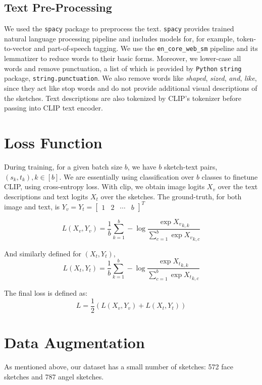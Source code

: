 \subsection{Text Pre-Processing}
We used the \texttt{spacy} package to preprocess the text. \texttt{spacy} provides trained natural language processing pipeline and includes models for, for example, token-to-vector and part-of-speech tagging. We use the \texttt{en\_core\_web\_sm} pipeline and its lemmatizer to reduce words to their basic forms. Moreover, we lower-case all words and remove punctuation, a list of which is provided by \texttt{Python} \texttt{string} package, \texttt{string.punctuation}. We also remove words like \textit{shaped}, \textit{sized}, \textit{and}, \textit{like}, since they act like stop words and do not provide additional visual descriptions of the sketches. Text descriptions are also tokenized by CLIP's tokenizer before passing into CLIP text encoder.     

\section{Loss Function}
During training, for a given batch size $b$, we have $b$ sketch-text pairs, $(s_k,t_k), k\in [b]$. We are essentially using classification over $b$ classes to finetune CLIP, using cross-entropy loss. With clip, we obtain image logits $X_v$ over the text descriptions and text logits $X_t$ over the sketches. The ground-truth, for both image and text, is 
$Y_v = Y_t = \begin{bmatrix}1 & 2 & \cdots & b \end{bmatrix}^T $ 

$$L(X_v, Y_v) = \dfrac{1}{b} \sum_{k=1}^b -\log\frac{\exp{{X_v}_{k,k}}}{ \sum_{c=1}^b \exp{{X_v}_{k,c}} } $$

And similarly defined for $(X_t, Y_t)$,
$$L(X_t, Y_t) = \dfrac{1}{b} \sum_{k=1}^b -\log\frac{\exp{{X_t}_{k,k}}}{ \sum_{c=1}^b \exp{{X_t}_{k,c}} } $$

The final loss is defined as:
$$L = \dfrac{1}{2} (L(X_v, Y_v) + L(X_t, Y_t))$$

\section{Data Augmentation}
As mentioned above, our dataset has a small number of sketches: 572 face sketches and 787 angel sketches.  